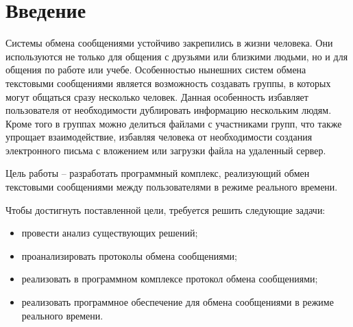 \chapter*{Введение}

Системы обмена сообщениями устойчиво закрепились в жизни человека. Они используются не только для общения с друзьями или близкими людьми, но и для общения по работе или учебе. Особенностью нынешних систем обмена текстовыми сообщениями является возможность создавать группы, в которых могут общаться сразу несколько человек. Данная особенность избавляет пользователя от необходимости дублировать информацию нескольким людям. Кроме того в группах можно делиться файлами с участниками групп, что также упрощает взаимодействие, избавляя человека от необходимости создания электронного письма с вложением или загрузки файла на удаленный сервер.

Цель работы -- разработать программный комплекс, реализующий обмен текстовыми сообщениями между пользователями в режиме реального времени.

Чтобы достигнуть поставленной цели, требуется решить следующие задачи:
\begin{itemize}
	\item провести анализ существующих решений;
	\item проанализировать протоколы обмена сообщениями;
	\item реализовать в программном комплексе протокол обмена сообщениями;
	\item реализовать программное обеспечение для обмена сообщениями в режиме реального времени.
\end{itemize}